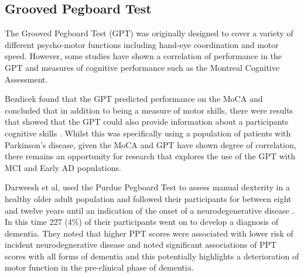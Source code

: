 \documentclass[10pt, letterpaper, twoside, openany]{book}
\begin{document}
\subsection{Grooved Pegboard Test}
The Grooved Pegboard Test (GPT) was originally designed to cover a variety of different psycho-motor functions including hand-eye coordination and motor speed. However, some studies have shown a correlation of performance in the GPT and measures of cognitive performance such as the Montreal Cognitive Assessment.
\par 
Bezdicek found that the GPT predicted performance on the MoCA and concluded that in addition to being a measure of motor skills, there were results that showed that the GPT could also provide information about a participants cognitive skills \cite{Bezdicek2014}. Whilst this was specifically using a population of patients with Parkinson's disease, given the MoCA and GPT have shown degree of correlation, there remains an opportunity for research that explores the use of the GPT with MCI and Early AD populations.
\par 
Darweesh et al, used the Purdue Pegboard Test to assess manual dexterity in a healthy older adult population and followed their participants for between eight and twelve years until an indication of the onset of a neurodegenerative disease \cite{Darweesh2017}. In this time 227 (4\%) of their participants went on to develop a diagnosis of dementia. They noted that higher PPT scores were associated with lower risk of incident neurodegnerative disease and noted significant associations of PPT scores with all forms of dementia and this potentially highlights a deterioration of motor function in the pre-clinical  phase of dementia.
\end{document}

